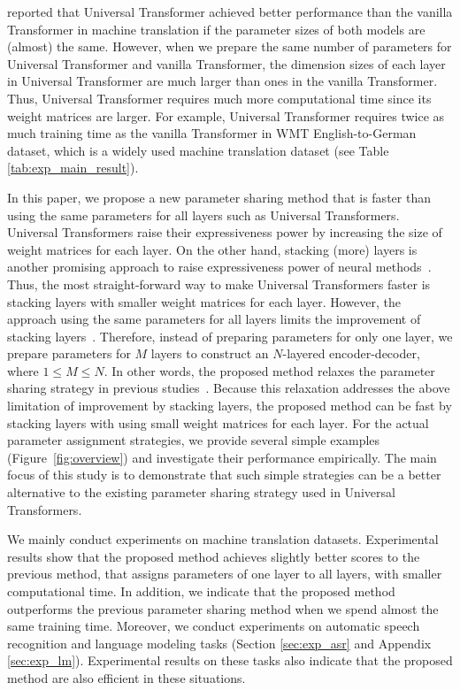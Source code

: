 \documentclass[11pt]{article}
\begin{document}
\citet{dehghani2019} reported that Universal Transformer achieved better performance than the vanilla Transformer in machine translation if the parameter sizes of both models are (almost) the same.
However, when we prepare the same number of parameters for Universal Transformer and vanilla Transformer, the dimension sizes of each layer in Universal Transformer are much larger than ones in the vanilla Transformer.
Thus, Universal Transformer requires much more computational time since its weight matrices are larger.
For example, Universal Transformer requires twice as much training time as the vanilla Transformer in WMT English-to-German dataset, which is a widely used machine translation dataset (see Table \ref{tab:exp_main_result}).


In this paper, we propose a new parameter sharing method that is faster than using the same parameters for all layers such as Universal Transformers.
Universal Transformers raise their expressiveness power by increasing the size of weight matrices for each layer.
On the other hand, stacking (more) layers is another promising approach to raise expressiveness power of neural methods~\cite{7780459}.
Thus, the most straight-forward way to make Universal Transformers faster is stacking layers with smaller weight matrices for each layer.
However, the approach using the same parameters for all layers limits the improvement of stacking layers~\cite{Dabre_Fujita_2019}.
Therefore, instead of preparing parameters for only one layer, we prepare parameters for $M$ layers to construct an $N$-layered encoder-decoder, where $1 \leq M \leq N$.
In other words, the proposed method relaxes the parameter sharing strategy in previous studies~\cite{dehghani2019,Dabre_Fujita_2019,lan2020}.
Because this relaxation addresses the above limitation of improvement by stacking layers, the proposed method can be fast by stacking layers with using small weight matrices for each layer.
For the actual parameter assignment strategies, we provide several simple examples (Figure~\ref{fig:overview}) and investigate their performance empirically.
The main focus of this study is to demonstrate that such simple strategies can be a better alternative to the existing parameter sharing strategy used in Universal Transformers.


We mainly conduct experiments on machine translation datasets.
Experimental results show that the proposed method achieves slightly better scores to the previous method, that assigns parameters of one layer to all layers, with smaller computational time.
In addition, we indicate that the proposed method outperforms the previous parameter sharing method when we spend almost the same training time.
Moreover, we conduct experiments on automatic speech recognition and language modeling tasks (Section \ref{sec:exp_asr} and Appendix \ref{sec:exp_lm}).
Experimental results on these tasks also indicate that the proposed method are also efficient in these situations.
\end{document}
